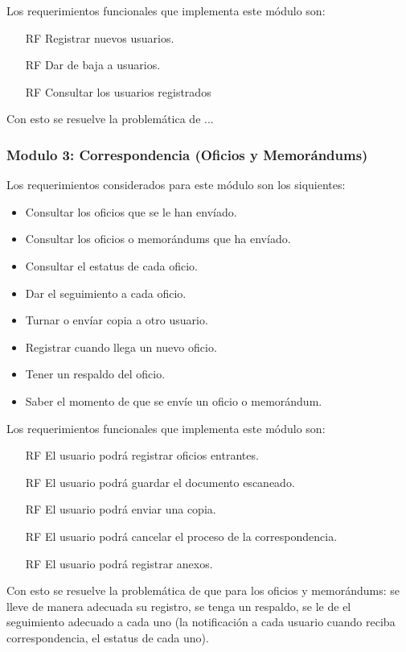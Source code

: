 Los requerimientos funcionales que implementa este módulo son:
\begin{itemize}
	\item[RF] Registrar nuevos usuarios.
	\item[RF] Dar de baja a usuarios.
	\item[RF] Consultar los usuarios registrados
\end{itemize}

Con esto se resuelve la problemática de ...

\subsubsection{Modulo 3: Correspondencia (Oficios y Memorándums)}
Los requerimientos considerados para este módulo son los siquientes:

\begin{itemize}
	\item Consultar los oficios que se le han envíado.
	\item Consultar los oficios o memorándums que ha envíado.
	\item Consultar el estatus de cada oficio.
	\item Dar el seguimiento a cada oficio.
	\item Turnar o envíar copia a otro usuario.
	\item Registrar cuando llega un nuevo oficio.
	\item Tener un respaldo del oficio.
	\item Saber el momento de que se envíe un oficio o memorándum.
\end{itemize}

Los requerimientos funcionales que implementa este módulo son:
\begin{itemize}
	\item[RF] El usuario podrá registrar oficios entrantes.
	\item[RF] El usuario podrá guardar el documento escaneado.
	\item[RF] El usuario podrá enviar una copia.
	\item[RF] El usuario podrá cancelar el proceso de la correspondencia.
	\item[RF] El usuario podrá registrar anexos.
\end{itemize}

Con esto se resuelve la problemática de que para los oficios y memorándums: se lleve de manera adecuada su registro, se tenga un respaldo, se le de el seguimiento adecuado a cada uno (la notificación a cada usuario cuando reciba correspondencia, el estatus de cada uno).


